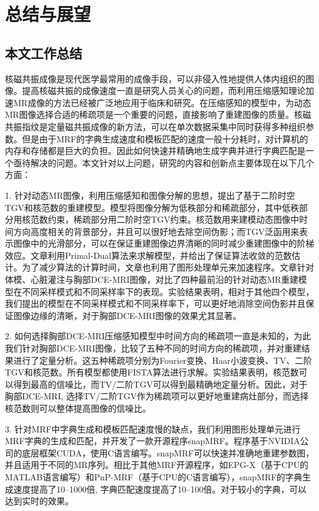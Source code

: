 \chapter{总结与展望}
\label{chap:future}

\section{本文工作总结}
核磁共振成像是现代医学最常用的成像手段，可以非侵入性地提供人体内组织的图像。提高核磁共振的成像速度一直是研究人员关心的问题，而利用压缩感知理论加速MR成像的方法已经被广泛地应用于临床和研究。在压缩感知的模型中，为动态MR图像选择合适的稀疏项是一个重要的问题，直接影响了重建图像的质量。核磁共振指纹是定量磁共振成像的新方法，可以在单次数据采集中同时获得多种组织参数。但是由于MRF的字典生成速度和模板匹配的速度一般十分耗时，对计算机的内存和存储都是巨大的负担。因此如何快速并精确地生成字典并进行字典匹配是一个亟待解决的问题。本文针对以上问题，研究的内容和创新点主要体现在以下几个方面：

1. 针对动态MR图像，利用压缩感知和图像分解的思想，提出了基于二阶时空TGV和核范数的重建模型。模型将图像分解为低秩部分和稀疏部分，其中低秩部分用核范数约束，稀疏部分用二阶时空TGV约束。核范数用来建模动态图像中时间方向高度相关的背景部分，并且可以很好地去除空间伪影；而TGV泛函用来表示图像中的光滑部分，可以在保证重建图像边界清晰的同时减少重建图像中的阶梯效应。文章利用Primal-Dual算法来求解模型，并给出了保证算法收敛的范数估计。为了减少算法的计算时间，文章也利用了图形处理单元来加速程序。文章针对体模、心脏灌注与胸部DCE-MRI图像，对比了四种最前沿的针对动态MR重建模型在不同采样模式和不同采样率下的表现。实验结果表明，相对于其他四个模型，我们提出的模型在不同采样模式和不同采样率下，可以更好地消除空间伪影并且保证图像边缘的清晰，对于胸部DCE-MRI图像的效果尤其显著。

2. 如何选择胸部DCE-MRI压缩感知模型中时间方向的稀疏项一直是未知的，为此我们针对胸部DCE-MRI图像，比较了五种不同的时间方向的稀疏项，并对重建结果进行了定量分析。这五种稀疏项分别为Fourier变换、Haar小波变换、TV、二阶TGV和核范数。所有模型都使用FISTA算法进行求解。实验结果表明，核范数可以得到最高的信噪比，而TV/二阶TGV可以得到最精确地定量分析。因此，对于胸部DCE-MRI, 选择TV/二阶TGV作为稀疏项可以更好地重建病灶部分，而选择核范数则可以整体提高图像的信噪比。

3. 针对MRF中字典生成和模板匹配速度慢的缺点，我们利用图形处理单元进行MRF字典的生成和匹配，并开发了一款开源程序snapMRF。程序基于NVIDIA公司的底层框架CUDA，使用C语言编写。snapMRF可以快速并准确地重建参数图，并且适用于不同的MR序列。相比于其他MRF开源程序，如EPG-X（基于CPU的MATLAB语言编写）和PnP-MRF（基于CPU的C语言编写），snapMRF的字典生成速度提高了10--1000倍, 字典匹配速度提高了10--100倍。对于较小的字典，可以达到实时的效果。

